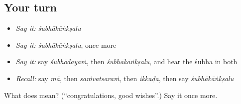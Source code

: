 \subsection*{Your turn}
\begin{itemize}
\raggedright
  \item \emph{Say it:} \emph{śubhākāṅkṣalu}
  \item \emph{Say it:} \emph{śubhākāṅkṣalu}, once more
  \item \emph{Say it:} say \emph{śubhōdayaṁ}, then \emph{śubhākāṅkṣalu}, and hear the śubha in both
  \item \emph{Recall:} say \emph{mā}, then \emph{saṁvatsaraṁ}, then \emph{ikkaḍa}, then say \emph{śubhākāṅkṣalu}
\end{itemize}

\begin{tcolorbox}[breakable,colback=teal!4,colframe=teal!35!black,title={Before you move on}]
What does  mean? (\textquotedblleft{}congratulations, good wishes\textquotedblright{}.) Say it once more.
\end{tcolorbox}
